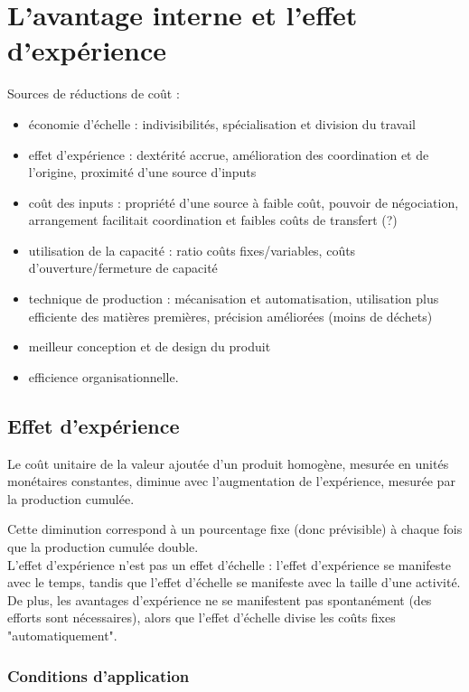 	\section{L'avantage interne et l'effet d'expérience}
	
	Sources de réductions de coût :
	
	\begin{itemize}
		\item économie d'échelle : indivisibilités, spécialisation et division du travail
		\item effet d'expérience : dextérité accrue, amélioration des coordination et de l'origine, proximité d'une source d'inputs
		\item coût des inputs : propriété d'une source à faible coût, pouvoir de négociation, arrangement facilitait coordination et faibles coûts de transfert (?)
		\item utilisation de la capacité : ratio coûts fixes/variables, coûts d'ouverture/fermeture de capacité
		\item technique de production : mécanisation et automatisation, utilisation plus efficiente des matières premières, précision améliorées (moins de déchets)
		\item meilleur conception et de design du produit
		\item efficience organisationnelle.
	\end{itemize}
	
		\subsection{Effet d'expérience}
	
		Le coût unitaire de la valeur ajoutée d'un produit homogène, mesurée en unités monétaires constantes, diminue avec l'augmentation de l'expérience, mesurée par la production cumulée. 
		
		Cette diminution correspond à un pourcentage fixe (donc prévisible) à chaque fois que la production cumulée double. \\
		
		L'effet d'expérience n'est pas un effet d'échelle : l'effet d'expérience se manifeste avec le temps, tandis que l'effet d'échelle se manifeste avec la taille d'une activité. De plus, les avantages d'expérience ne se manifestent pas spontanément (des efforts sont nécessaires), alors que l'effet d'échelle divise les coûts fixes "automatiquement".
		
			\subsubsection{Conditions d'application}
		
